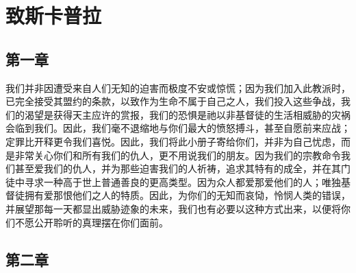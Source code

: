 
\chapter{致斯卡普拉}


\par


\section{第一章}

我们并非因遭受来自人们无知的迫害而极度不安或惊慌；因为我们加入此教派时，已完全接受其盟约的条款，以致作为生命不属于自己之人，我们投入这些争战，我们的渴望是获得天主应许的赏报，我们的恐惧是祂以非基督徒的生活相威胁的灾祸会临到我们。因此，我们毫不退缩地与你们最大的愤怒搏斗，甚至自愿前来应战；定罪比开释更令我们喜悦。因此，我们将此小册子寄给你们，并非为自己忧虑，而是非常关心你们和所有我们的仇人，更不用说我们的朋友。因为我们的宗教命令我们甚至爱我们的仇人，并为那些迫害我们的人祈祷，追求其特有的成全，并在其门徒中寻求一种高于世上普通善良的更高类型。因为众人都爱那爱他们的人；唯独基督徒拥有爱那恨他们之人的特质。因此，为你们的无知而哀恸，怜悯人类的错误，并展望那每一天都显出威胁迹象的未来，我们也有必要以这种方式出来，以便将你们不愿公开聆听的真理摆在你们面前。\par


\section{第二章}

